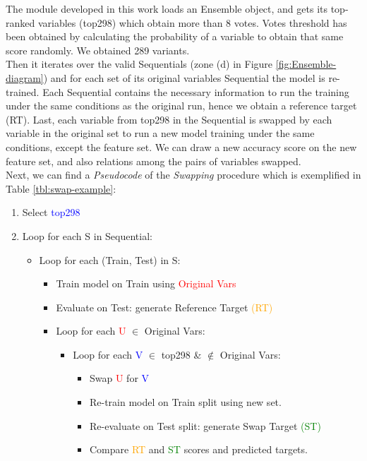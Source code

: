 The module developed in this work loads an Ensemble object, and gets its top-ranked variables (top298) which obtain more than 8 votes. Votes threshold has been obtained by calculating the probability of a variable to obtain that same score randomly. We obtained 289 variants.
\\

Then it iterates over the valid Sequentials (zone (d) in Figure \ref{fig:Ensemble-diagram}) and for each set of its original variables Sequential the model is re-trained. Each Sequential contains the necessary information to run the training under the same conditions as the original run, hence we obtain a reference target (RT). Last, each variable from top298 in the Sequential is swapped by each variable in the original set to run a new model training under the same conditions, except the feature set.
We can draw a new accuracy score on the new feature set, and also relations among the pairs of variables swapped.
\\

Next, we can find a \emph{Pseudocode} of the \emph{Swapping} procedure which is exemplified in Table \ref{tbl:swap-example}:
\begin{enumerate}
    \item Select \textcolor{blue}{top298}
    \item Loop for each S in Sequential:
    \begin{itemize}
        \item Loop for each (Train, Test) in S:
        \begin{itemize}
            \item Train model on Train using \textcolor{red}{Original Vars}
            \item Evaluate on Test: generate Reference Target \textcolor{orange}{(RT)}
            \item Loop for each \textcolor{red}{U}  $\in$  Original Vars:
            \begin{itemize}
                \item Loop for each \textcolor{blue}{V}  $\in$  top298 \& $\not \in$ Original Vars:
                \begin{itemize}
                    \item Swap \textcolor{red}{U} for \textcolor{blue}{V}
                    \item Re-train model on Train split using new set.
                    \item Re-evaluate on Test split: generate Swap Target \textcolor{green}{(ST)}
                    \item Compare \textcolor{orange}{RT} and \textcolor{green}{ST} scores and predicted targets.
                \end{itemize}
            \end{itemize}
        \end{itemize}
    \end{itemize}
\end{enumerate}


